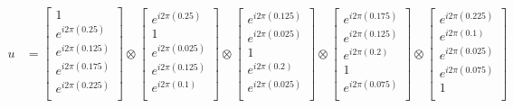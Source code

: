 \documentclass[msc,oneside]{ubcthesis}
\begin{document}
	
	\begin{align*}	
		u & = \begin{bmatrix}
			1 \\
			e^{i2\pi(0.25)} \\
			e^{i2\pi(0.125)} \\
			e^{i2\pi(0.175)} \\
			e^{i2\pi(0.225)} \\
		\end{bmatrix} 
		\otimes \begin{bmatrix}
			e^{i2\pi(0.25)} \\
			1 \\
			e^{i2\pi(0.025)} \\
			e^{i2\pi(0.125)} \\
			e^{i2\pi(0.1)} \\
		\end{bmatrix}
		\otimes \begin{bmatrix}
			e^{i2\pi(0.125)} \\
			e^{i2\pi(0.025)} \\
			1\\
			e^{i2\pi(0.2)} \\
			e^{i2\pi(0.025)} \\
		\end{bmatrix} 
		\otimes \begin{bmatrix}
			e^{i2\pi(0.175)} \\
			e^{i2\pi(0.125)} \\
			e^{i2\pi(0.2)} \\
			1 \\
			e^{i2\pi(0.075)} \\
		\end{bmatrix} 
		\otimes \begin{bmatrix}
			e^{i2\pi(0.225)} \\
			e^{i2\pi(0.1)} \\
			e^{i2\pi(0.025)} \\
			e^{i2\pi(0.075)} \\
			1 \\
		\end{bmatrix} 							 			
	\end{align*}
	
\end{document}
